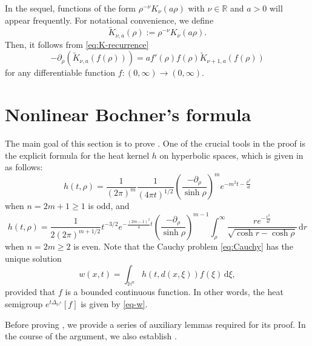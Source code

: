 \documentclass[11pt]{amsart}
\theoremstyle{plain}
\theoremstyle{definition}
\numberwithin{equation}{section}
\begin{document}
In the sequel, functions of the form $\rho^{-\nu}K_{\nu}(a\rho)$ with $\nu \in \mathbb{R}$ and $a > 0$ will appear frequently. For notational convenience, we define
\begin{equation} \label{eq:K-scr}
\widetilde{K}_{\nu, a}(\rho) := \rho^{-\nu} K_{\nu}(a\rho).
\end{equation}
Then, it follows from \eqref{eq:K-recurrence}
\begin{equation} \label{eq:scrK-recurrence}
-\partial_{\rho} (\widetilde{K}_{\nu, a}(f(\rho))) = a f'(\rho) f(\rho) \widetilde{K}_{\nu+1, a}(f(\rho))
\end{equation}
for any differentiable function $f : (0, \infty) \to (0, \infty)$.


\section{Nonlinear Bochner's formula} \label{sec:kernel}


The main goal of this section is to prove . One of the crucial tools in the proof is the explicit formula for the heat kernel $h$ on hyperbolic spaces, which is given in \cite{GN98} as follows:
\begin{equation} \label{eq:hk-odd}
h(t, \rho) = \frac{1}{(2\pi)^{m}} \frac{1}{(4\pi t)^{1/2}} \left( \frac{-\partial_{\rho}}{\sinh \rho} \right)^{m} e^{-m^{2} t-\frac{\rho^2}{4t}}
\end{equation}
when $n = 2m+1 \geq 1$ is odd, and
\begin{equation} \label{eq:hk-even}
h(t, \rho) = \frac{1}{2(2\pi)^{m+1/2}} t^{-3/2} e^{-\frac{(2m-1)^2}{4}t} \left( \frac{-\partial_{\rho}}{\sinh \rho} \right)^{m-1} \int_{\rho}^{\infty} \frac{r e^{-\frac{r^2}{4t}}}{\sqrt{\cosh r-\cosh \rho}} \,\mathrm{d}r
\end{equation}
when $n=2m \geq 2$ is even. Note that the Cauchy problem \eqref{eq:Cauchy} has the unique solution
\begin{equation}\label{eq-w}
w(x,t) = \int_{\mathbb{H}^{n}} h(t, d(x, \xi)) f(\xi) \,\mathrm{d}\xi,
\end{equation}
provided that $f$ is a bounded continuous function. In other words, the heat semigroup $e^{t\Delta_{\mathbb{H}^n}}[f]$ is given by \eqref{eq-w}.

Before proving , we provide a series of auxiliary lemmas required for its proof. In the course of the argument, we also establish .
\end{document}
